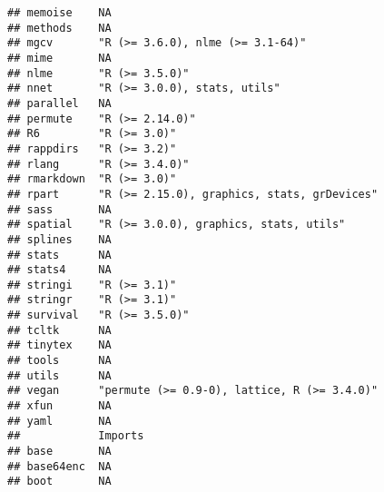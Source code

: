 \documentclass[
]{article}
\begin{document}
\begin{verbatim}
## memoise    NA                                               
## methods    NA                                               
## mgcv       "R (>= 3.6.0), nlme (>= 3.1-64)"                 
## mime       NA                                               
## nlme       "R (>= 3.5.0)"                                   
## nnet       "R (>= 3.0.0), stats, utils"                     
## parallel   NA                                               
## permute    "R (>= 2.14.0)"                                  
## R6         "R (>= 3.0)"                                     
## rappdirs   "R (>= 3.2)"                                     
## rlang      "R (>= 3.4.0)"                                   
## rmarkdown  "R (>= 3.0)"                                     
## rpart      "R (>= 2.15.0), graphics, stats, grDevices"      
## sass       NA                                               
## spatial    "R (>= 3.0.0), graphics, stats, utils"           
## splines    NA                                               
## stats      NA                                               
## stats4     NA                                               
## stringi    "R (>= 3.1)"                                     
## stringr    "R (>= 3.1)"                                     
## survival   "R (>= 3.5.0)"                                   
## tcltk      NA                                               
## tinytex    NA                                               
## tools      NA                                               
## utils      NA                                               
## vegan      "permute (>= 0.9-0), lattice, R (>= 3.4.0)"      
## xfun       NA                                               
## yaml       NA                                               
##            Imports                                                                                                                                                                                                
## base       NA                                                                                                                                                                                                     
## base64enc  NA                                                                                                                                                                                                     
## boot       NA                                                                                                                                                                                                     

\end{verbatim}
\end{document}
